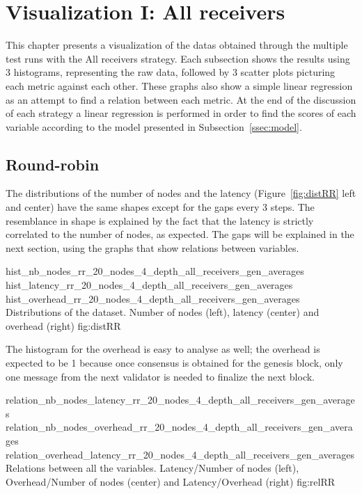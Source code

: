
\section{Visualization I: All receivers}
This chapter presents a visualization of the datas obtained through the multiple
test runs with the All receivers strategy.  Each subsection shows the results
using 3 histograms, representing the raw data, followed by 3 scatter plots
picturing each metric against each other. These graphs also show a simple linear
regression as an attempt to find a relation between each metric. At the end of
the discussion of each strategy a linear regression is performed in order to
find the scores of each variable according to the model presented in
Subsection~\ref{ssec:model}.



\subsection{Round-robin}

The distributions of the number of nodes and the latency
(Figure~\ref{fig:distRR} left and center) have the same
shapes except for the gaps every 3 steps. The resemblance in shape is explained
by the fact that the latency is strictly correlated to the number of nodes, as
expected.
The gaps will be explained in the next section, using the graphs that show
relations between variables. 

\triplefigure
    {hist_nb_nodes_rr_20_nodes_4_depth_all_receivers_gen_averages}
    {hist_latency_rr_20_nodes_4_depth_all_receivers_gen_averages}
    {hist_overhead_rr_20_nodes_4_depth_all_receivers_gen_averages}
    {Distributions of the dataset. Number of nodes (left), latency (center)
    and overhead (right) }
    {fig:distRR}

The histogram for the overhead is easy to analyse as well; the overhead is
expected to be 1 because once consensus is obtained for the genesis block, only
one message from the next validator is needed to finalize the next block.

\triplefigure
    {relation_nb_nodes_latency_rr_20_nodes_4_depth_all_receivers_gen_averages}
    {relation_nb_nodes_overhead_rr_20_nodes_4_depth_all_receivers_gen_averages}
    {relation_overhead_latency_rr_20_nodes_4_depth_all_receivers_gen_averages}
    {Relations between all the variables. Latency/Number of nodes (left),
    Overhead/Number of nodes (center) and Latency/Overhead (right)}
    {fig:relRR}

